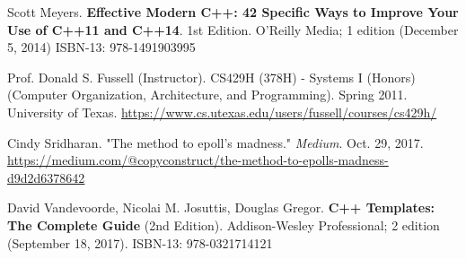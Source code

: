 \documentclass[10pt]{amsart}
\begin{document}
\begin{thebibliography}{9}
Scott Meyers.  \textbf{Effective Modern C++: 42 Specific Ways to Improve Your Use of C++11 and C++14}. 1st Edition.  O'Reilly Media; 1 edition (December 5, 2014)  ISBN-13: 978-1491903995

Prof. Donald S. Fussell (Instructor). CS429H (378H) - Systems I (Honors) (Computer Organization, Architecture, and Programming). Spring 2011. University of Texas. \url{https://www.cs.utexas.edu/users/fussell/courses/cs429h/}

 Cindy Sridharan. "The method to epoll's madness." \emph{Medium}. Oct. 29, 2017. \url{https://medium.com/@copyconstruct/the-method-to-epolls-madness-d9d2d6378642}

David Vandevoorde, Nicolai M. Josuttis, Douglas Gregor. \textbf{C++ Templates: The Complete Guide} (2nd Edition). Addison-Wesley Professional; 2 edition (September 18, 2017). ISBN-13: 978-0321714121

\end{thebibliography}
\end{document}

